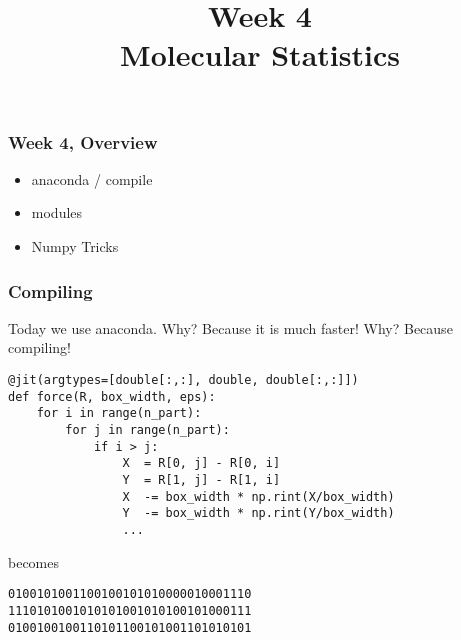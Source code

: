 

\usepackage{soul}

\title[]{Week 4\\Molecular Statistics}








{
\usebackgroundtemplate{}
\begin{frame}[plain]
    \titlepage
    \addtocounter{framenumber}{-1}
\end{frame}
}

\begin{frame}[fragile]

    \frametitle{Week 4, Overview}

    \begin{itemize}

        \item anaconda / compile

        \item modules

        \item Numpy Tricks


    \end{itemize}

\end{frame}


\begin{frame}[fragile]

    \frametitle{Compiling}

    Today we use anaconda. Why?\newline
    Because it is much faster! Why?\newline
    Because compiling!

\begin{lstlisting}
@jit(argtypes=[double[:,:], double, double[:,:]])
def force(R, box_width, eps):
    for i in range(n_part):
        for j in range(n_part):
            if i > j:
                X  = R[0, j] - R[0, i]
                Y  = R[1, j] - R[1, i]
                X  -= box_width * np.rint(X/box_width)
                Y  -= box_width * np.rint(Y/box_width)
                ...
\end{lstlisting}

    becomes

\begin{lstlisting}
0100101001100100101010000010001110
1110101001010101001010100101000111
0100100100110101100101001101010101
\end{lstlisting}


\end{frame}



